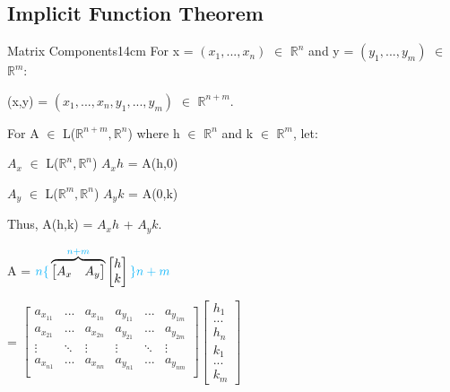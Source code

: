     \vspace{0.5cm}




    
\subsection{ Implicit Function Theorem }

    \begin{definition}{Matrix Components}{14cm}
        For x = $(x_1,...,x_n)$ $\in$ $\mathbb{R}^n$ and
        y = $(y_1,...,y_m)$ $\in$ $\mathbb{R}^m$:

        \hspace{0.5cm}
        (x,y) = $(x_1,...,x_n,y_1,...,y_m)$ $\in$ $\mathbb{R}^{n+m}$.

        For A $\in$ L($\mathbb{R}^{n+m},\mathbb{R}^n$)
        where h $\in$ $\mathbb{R}^n$ and k $\in$ $\mathbb{R}^m$, let:

        \hspace{0.5cm}
        $A_x$ $\in$ L($\mathbb{R}^n,\mathbb{R}^n$)
        \hspace{1cm}
        $A_xh$ = A(h,0)
        
        \hspace{0.5cm}
        $A_y$ $\in$ L($\mathbb{R}^m,\mathbb{R}^n$)
        \hspace{1cm}
        $A_yk$ = A(0,k)

        Thus, A(h,k) = $A_xh$ + $A_yk$.

        \hspace{0.5cm}
        A =
        ${\color{lblue} n \lbrace}
        \overbrace{\begin{bmatrix}
                        A_x & A_y
                    \end{bmatrix}}^{{\color{lblue} n+m}}
        \begin{bmatrix}
            h \\
            k
        \end{bmatrix} {\color{lblue} \rbrace n+m}$
        
        \hspace{0.9cm}
        =
        $\begin{bmatrix}
            a_{x_{11}} & ... & a_{x_{1n}} & a_{y_{11}} & ... & a_{y_{1m}} \\
            a_{x_{21}} & ... & a_{x_{2n}} & a_{y_{21}} & ... & a_{y_{2m}} \\
            \vdots & \ddots & \vdots & \vdots & \ddots & \vdots \\
            a_{x_{n1}} & ... & a_{x_{nn}} & a_{y_{n1}} & ... & a_{y_{nm}} \\
        \end{bmatrix}
        \begin{bmatrix}
            h_1 \\
            ... \\
            h_n \\
            k_1 \\
            ... \\
            k_m
        \end{bmatrix}$


\end{definition}
